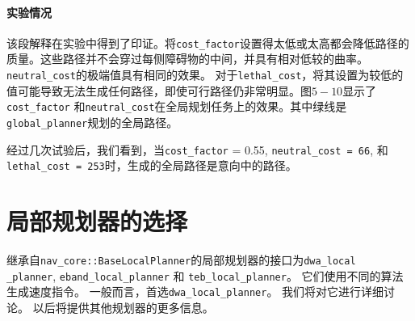 \paragraph[Experiment observations]{实验情况} %

该段解释在实验中得到了印证。将\texttt{cost\_factor}设置得太低或太高都会降低路径的质量。这些路径并不会穿过每侧障碍物的中间，并具有相对低较的曲率。
\texttt{neutral\_cost}的极端值具有相同的效果。
对于\texttt{lethal\_cost}，将其设置为较低的值可能导致无法生成任何路径，即使可行路径仍非常明显。图$5-10$显示了\texttt{cost\_factor} 和\texttt{neutral\_cost}在全局规划任务上的效果。其中绿线是\texttt{global\_planner}规划的全局路径。


经过几次试验后，我们看到，当\texttt{cost\_factor} = 0.55, \texttt{neutral\_cost = 66}, 和 \texttt{lethal\_cost = 253}时，生成的全局路径是意向中的路径。

\section[Local Planner Selection]{局部规划器的选择}


继承自\texttt{nav\_core::BaseLocalPlanner}的局部规划器的接口为\texttt{dwa\_local\\\_planner}, \texttt{eband\_local\_planner} 和 \texttt{teb\_local\_planner}。
它们使用不同的算法生成速度指令。
一般而言，首选\texttt{dwa\_local\_planner}。
我们将对它进行详细讨论。
以后将提供其他规划器的更多信息。

